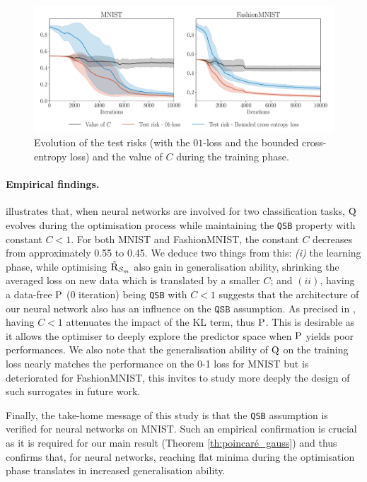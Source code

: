 \begin{figure}[!h]
    \centering
    \includegraphics[width=1.0\linewidth]{chapter_4/figure.pdf}
    \caption{Evolution of the test risks (with the $01$-loss and the bounded cross-entropy loss) and the value of $C$ during the training phase.}
    \label{fig:expe}
\end{figure}

\paragraph{Empirical findings.}
 illustrates that, when neural networks are involved for two classification tasks, $\Q$ evolves during the optimisation process while maintaining the \texttt{QSB} property with constant $C<1$.
For both MNIST and FashionMNIST, the constant $C$ decreases from approximately 0.55 to 0.45. We deduce two things from this: \emph{(i)} the learning phase, while optimising $\hat{\Risk}_{\S_m}$ also gain in generalisation ability, shrinking the averaged loss on new data which is translated by a smaller $C$; and $(ii)$, having a data-free $\P$ (0 iteration) being \texttt{QSB} with $C<1$ suggests that the architecture of our neural network also has an influence on the $\texttt{QSB}$ assumption. As precised in , having $C<1$ attenuates the impact of the KL term, thus $\P$. This is desirable as it allows the optimiser to deeply explore the predictor space when $\P$ yields poor performances. We also note that the generalisation ability of $\Q$ on the training loss nearly matches the performance on the 0-1 loss for MNIST but is deteriorated for FashionMNIST, this invites to study more deeply the design of such surrogates in future work. 

\noindent{}Finally, the take-home message of this study is that the \texttt{QSB} assumption is verified for neural networks on MNIST. Such an empirical confirmation is crucial as it is required for our main result (Theorem \ref{th:poincaré_gauss}) and thus confirms that, for neural networks, reaching flat minima during the optimisation phase translates in increased generalisation ability.



